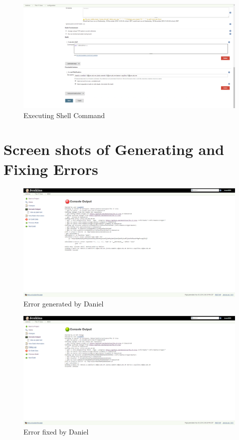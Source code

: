 \documentclass[UTF8]{article}
\begin{document}
\begin{figure}[h]
  \includegraphics[width=\textwidth, height=\textheight,keepaspectratio]{JenkinsSetup3}
  \caption{Executing Shell Command}
\end{figure}

\newpage
\section{Screen shots of Generating and Fixing Errors}
\begin{figure}[h]
  \includegraphics[width=\textwidth, height=\textheight,keepaspectratio]{Break1Daniel.PNG}
  \caption{Error generated by Daniel}
\end{figure}

\begin{figure}[h]
  \includegraphics[width=\textwidth, height=\textheight,keepaspectratio]{BreakFix1Daniel.PNG}
  \caption{Error fixed by Daniel}
\end{figure}
\end{document}
